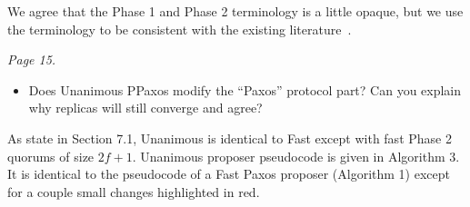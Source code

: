 \documentclass[letterpaper,twocolumn,10pt]{article}
\newenvironment{reviewerquote}
{\list{}{\leftmargin=\parindent\rightmargin=0in}\item[] \itshape \color{ReviewerDarkGray}}%
{\endlist}
\begin{document}
We agree that the Phase 1 and Phase 2 terminology is a little opaque, but we
use the terminology to be consistent with the existing
literature~\cite{howard2021fast}.

\begin{reviewerquote}
  Page 15.

  \begin{itemize}
    \item
      Does Unanimous PPaxos modify the ``Paxos'' protocol part? Can you explain
      why replicas will still converge and agree?
  \end{itemize}
\end{reviewerquote}

As state in Section 7.1, Unanimous \BPaxos{} is identical to Fast \BPaxos{}
except with fast Phase 2 quorums of size $2f+1$. Unanimous \BPaxos{} proposer
pseudocode is given in Algorithm 3. It is identical to the pseudocode of a Fast
Paxos proposer (Algorithm 1) except for a couple small changes highlighted in
red.
\end{document}
